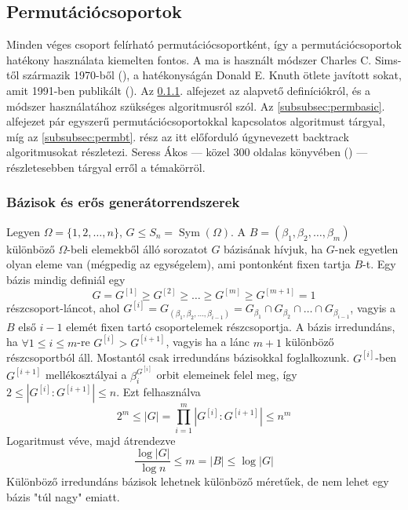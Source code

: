 \subsection{Permutációcsoportok}
\label{subsec:permutacio}
Minden véges csoport felírható permutációcsoportként, így a permutációcsoportok hatékony használata kiemelten fontos.
A ma is használt módszer Charles C. Sims-től származik 1970-ből (\cite{Sim70}), a hatékonyságán Donald E. Knuth ötlete javított sokat, amit 1991-ben publikált (\cite{Knu91}).
Az \ref{subsubsec:permdef}. alfejezet az alapvető definíciókról, és a módszer használatához szükséges algoritmusról szól.
Az \ref{subsubsec:permbasic}. alfejezet pár egyszerű permutációcsoportokkal kapcsolatos algoritmust tárgyal,
míg az \ref{subsubsec:permbt}. rész az itt előforduló úgynevezett backtrack algoritmusokat részletezi.
Seress Ákos --- közel 300 oldalas könyvében (\cite{Ser03}) --- részletesebben tárgyal erről a témakörröl.

\subsubsection{Bázisok és erős generátorrendszerek}
\label{subsubsec:permdef}
Legyen $\Omega=\{1, 2, \dots, n\}$, $G \le S_n = \mathop{Sym}(\Omega)$.
A $B=(\beta_1,\beta_2,\dots,\beta_m)$ különböző $\Omega$-beli elemekből álló sorozatot $G$ bázisának hívjuk,
ha $G$-nek egyetlen olyan eleme van (mégpedig az egységelem), ami pontonként fixen tartja $B$-t.
Egy bázis mindig definiál egy
\begin{equation}
\label{eq:permlanc}
G = G^{[1]} \ge G^{[2]} \ge \dots \ge G^{[m]} \ge G^{[m+1]} = 1
\end{equation}
részcsoport-láncot, ahol $G^{[i]}=G_{(\beta_1,\beta_2,\dots,\beta_{i-1})}=G_{\beta_1}\cap G_{\beta_2}\cap\dots\cap G_{\beta_{i-1}}$, vagyis a $B$ első $i-1$ elemét fixen tartó csoportelemek részcsoportja.
A bázis irredundáns, ha $\forall 1\le i \le m$-re $G^{[i]} > G^{[i+1]}$, vagyis ha a lánc $m+1$ különböző részcsoportból áll.
Mostantól csak irredundáns bázisokkal foglalkozunk.
$G^{[i]}$-ben $G^{[i+1]}$ mellékosztályai a $\beta_i^{G^{[i]}}$ orbit elemeinek felel meg, így $2 \le \left| G^{[i]} : G^{[i+1]} \right| \le n$.
Ezt felhasználva
\begin{equation}
\label{eq:permmeret}
2^m \le |G|=\prod_{i=1}^m \left| G^{[i]} : G^{[i+1]} \right| \le n^m
\end{equation}
Logaritmust véve, majd átrendezve
\begin{equation}
\label{eq:permmeret2}
\frac{\log |G|}{\log n} \le m = |B| \le \log |G|
\end{equation}
Különböző irredundáns bázisok lehetnek különböző méretűek, de nem lehet egy bázis "túl nagy" emiatt.

